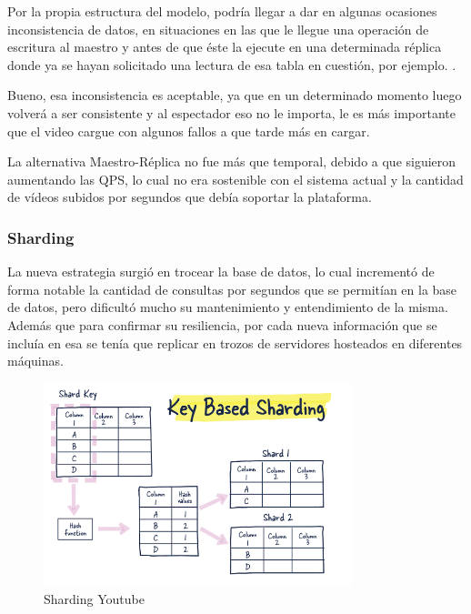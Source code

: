 \documentclass[12pt,a4paper]{article}
\begin{document}
    Por la propia estructura del modelo, podría llegar a dar en algunas ocasiones inconsistencia de datos, en situaciones en las que le llegue una operación de escritura al maestro y antes de que éste la ejecute en una determinada réplica donde ya se hayan solicitado una lectura de esa tabla en cuestión, por ejemplo. \cite{shivang2023b}.

    Bueno, esa inconsistencia es aceptable, ya que en un determinado momento luego volverá a ser consistente y al espectador eso no le importa, le es más importante que el video cargue con algunos fallos a que tarde más en cargar. 

    La alternativa Maestro-Réplica no fue más que temporal, debido a que siguieron aumentando las QPS, lo cual no era sostenible con el sistema actual y la cantidad de vídeos subidos por segundos que debía soportar la plataforma. 

    \subsubsection{Sharding}

    La nueva estrategia surgió en trocear la base de datos, lo cual incrementó de forma notable la cantidad de consultas por segundos que se permitían en la base de datos, pero dificultó mucho su mantenimiento y entendimiento de la misma. Además que para confirmar su resiliencia, por cada nueva información que se incluía en esa se tenía que replicar en trozos de servidores hosteados en diferentes máquinas.

    \begin{figure}[H]
        \centering
        \includegraphics[width=0.8\textwidth]{./img/sharding_youtube.png}
        \caption{Sharding Youtube}
        \label{fig:sharding_youtube}
    \end{figure}
\end{document}
